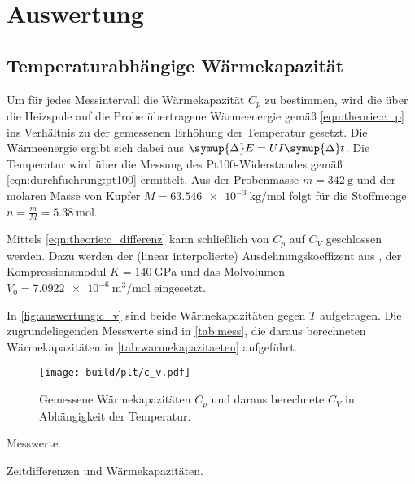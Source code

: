 \section{Auswertung}
\label{sec:auswertung}

\subsection{Temperaturabhängige Wärmekapazität}
Um für jedes Messintervall die Wärmekapazität $C_p$ zu bestimmen,
wird die über die Heizspule auf die Probe übertragene Wärmeenergie
gemäß \autoref{eqn:theorie:c_p} %
ins Verhältnis zu der gemessenen Erhöhung der Temperatur gesetzt.
Die Wärmeenergie ergibt sich dabei aus $\symup{\Delta}E = U I \symup{\Delta}t$.
Die Temperatur wird über die Messung des Pt100-Widerstandes gemäß \autoref{eqn:durchfuehrung:pt100} ermittelt.
Aus der Probenmasse $m = \SI{342}{\gram}$ \cite{versuchsanleitung}
und der molaren Masse von Kupfer $M = \SI{63.546e-3}{\kilogram\per\mol}$ \cite{periodictable}
folgt für die Stoffmenge $n = \frac{m}{M} = \SI{5.38}{\mol}$.

Mittels \autoref{eqn:theorie:c_differenz} kann schließlich von $C_p$ auf $C_V$ geschlossen werden.
Dazu werden
der (linear interpolierte) Ausdehnungskoeffizent aus \cite[Tabelle 2]{versuchsanleitung},
der Kompressionsmodul $K = \SI{140}{\giga\pascal}$ \cite{periodictable} und
das Molvolumen $V_0 = \SI{7.0922e-6}{\cubic\meter\per\mol}$ eingesetzt.

In \autoref{fig:auswertung:c_v} sind beide Wärmekapazitäten gegen $T$ aufgetragen.
Die zugrundeliegenden Messwerte sind in \autoref{tab:mess},
die daraus berechneten Wärmekapazitäten in \autoref{tab:warmekapazitaeten} aufgeführt.

\begin{figure}[H]
    \centering
    \texttt{[image: build/plt/c\_v.pdf]}
    \caption{Gemessene Wärmekapazitäten $C_p$ und daraus berechnete $C_V$ in Abhängigkeit der Temperatur.}
    \label{fig:auswertung:c_v}
\end{figure}

\begin{table}
    \centering
    \caption{Messwerte.}
    \label{tab:mess}
\end{table}

\begin{table}
    \centering
    \caption{Zeitdifferenzen und Wärmekapazitäten.}
    \label{tab:warmekapazitaeten}
\end{table}



